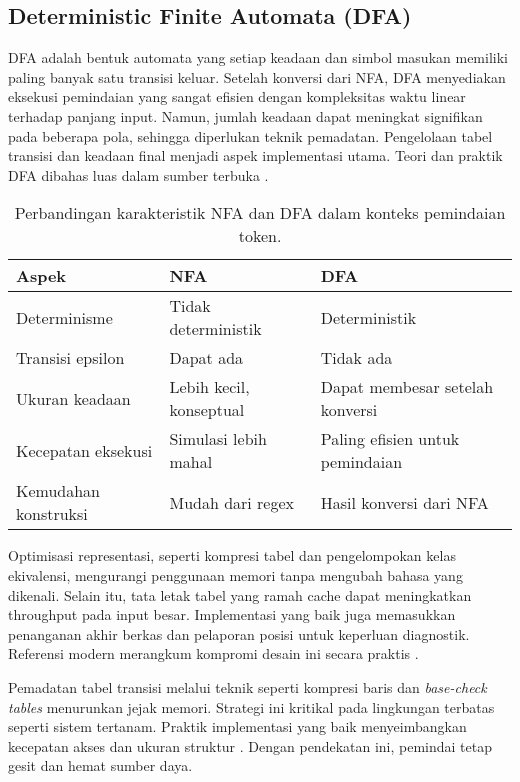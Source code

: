 \documentclass[../main.tex]{subfiles}
\begin{document}
\subsection{Deterministic Finite Automata (DFA)}
DFA adalah bentuk automata yang setiap keadaan dan simbol masukan memiliki paling banyak satu transisi keluar. Setelah konversi dari NFA, DFA menyediakan eksekusi pemindaian yang sangat efisien dengan kompleksitas waktu linear terhadap panjang input. Namun, jumlah keadaan dapat meningkat signifikan pada beberapa pola, sehingga diperlukan teknik pemadatan. Pengelolaan tabel transisi dan keadaan final menjadi aspek implementasi utama. Teori dan praktik DFA dibahas luas dalam sumber terbuka \citep{WikiDFA}.

\begin{table}[t]
  \centering
  \caption{Perbandingan karakteristik NFA dan DFA dalam konteks pemindaian token.}
  \label{tab:nfa-dfa}
  \begin{tabular}{@{}lll@{}}
    \toprule
    Aspek & NFA & DFA \\
    \midrule
    Determinisme & Tidak deterministik & Deterministik \\
    Transisi epsilon & Dapat ada & Tidak ada \\
    Ukuran keadaan & Lebih kecil, konseptual & Dapat membesar setelah konversi \\
    Kecepatan eksekusi & Simulasi lebih mahal & Paling efisien untuk pemindaian \\
    Kemudahan konstruksi & Mudah dari regex & Hasil konversi dari NFA \\
    \bottomrule
  \end{tabular}
\end{table}

Optimisasi representasi, seperti kompresi tabel dan pengelompokan kelas ekivalensi, mengurangi penggunaan memori tanpa mengubah bahasa yang dikenali. Selain itu, tata letak tabel yang ramah cache dapat meningkatkan throughput pada input besar. Implementasi yang baik juga memasukkan penanganan akhir berkas dan pelaporan posisi untuk keperluan diagnostik. Referensi modern merangkum kompromi desain ini secara praktis \citep{FlexManual,WikiDFA}.

Pemadatan tabel transisi melalui teknik seperti kompresi baris dan \emph{base-check tables} menurunkan jejak memori. Strategi ini kritikal pada lingkungan terbatas seperti sistem tertanam. Praktik implementasi yang baik menyeimbangkan kecepatan akses dan ukuran struktur \citep{WikiDFA}. Dengan pendekatan ini, pemindai tetap gesit dan hemat sumber daya.
\end{document}
